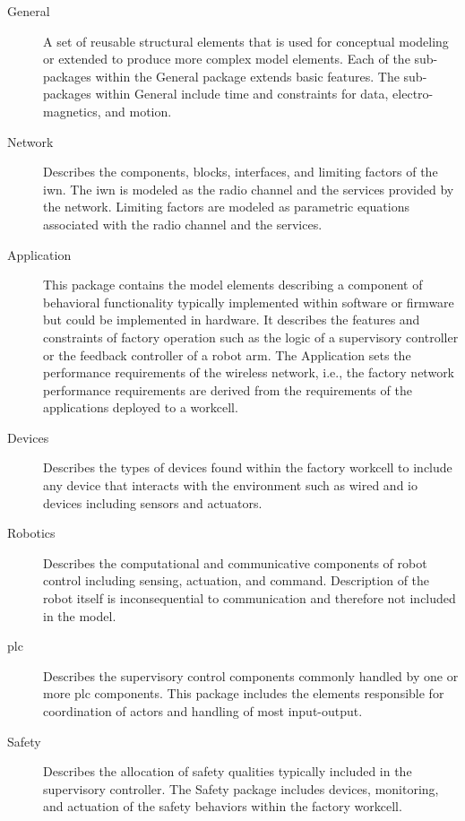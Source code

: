 \begin{description}

\item[General] A set of reusable structural elements that is used for conceptual modeling or extended to produce more complex model elements.  Each of the sub-packages within the General package extends basic features.  The sub-packages within General include time and constraints for data, electro-magnetics, and motion.

\item[Network] Describes the components, blocks, interfaces, and limiting factors of the \gls{iwn}.  The \gls{iwn} is modeled as the radio channel and the services provided by the network. Limiting factors are modeled as parametric equations associated with the radio channel and the services.

\item[Application]  This package contains the model elements describing a component of behavioral functionality typically implemented within software or firmware but could be implemented in hardware.  It describes the features and constraints of factory operation such as the logic of a supervisory controller or the feedback controller of a robot arm.  The Application sets the performance requirements of the wireless network, i.e., the factory network performance requirements are derived from the requirements of the applications deployed to a workcell.

\item[Devices] Describes the types of devices found within the factory workcell to include any device that interacts with the environment such as wired and \gls{io} devices including sensors and actuators.

\item[Robotics] Describes the computational and communicative components of robot control including sensing, actuation, and command.  Description of the robot itself is inconsequential to communication and therefore not included in the model.

\item[\gls{plc}] Describes the supervisory control components commonly handled by one or more \gls{plc} components.  This package includes the elements responsible for coordination of actors and handling of most input-output.

\item[Safety] Describes the allocation of safety qualities typically included in the supervisory controller.  The Safety package includes devices, monitoring, and actuation of the safety behaviors within the factory workcell.


\end{description}
